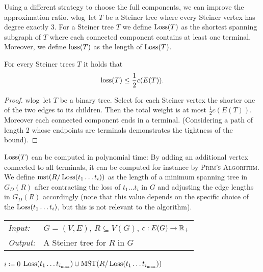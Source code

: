 \documentclass[../skript.tex]{subfiles}
\begin{document}
Using a different strategy to choose the full components, we can improve the approximation ratio. \ac{wlog}\ let $T$ be a Steiner tree where every Steiner vertex has degree exactly 3.
For a Steiner tree $T$ we define $\operatorname{Loss}(T)$ as the shortest spanning subgraph of $T$ where each connected component contains at least one terminal. Moreover, we define $\operatorname{loss}(T)$ as the length of $\operatorname{Loss}(T)$.
\begin{lemma} %
\label{thm:78}
For every Steiner trees $T$ it holds that
\[
	\operatorname{loss}(T) \leq \frac{1}{2} c(E(T)).
\]
\end{lemma}
\begin{proof}
\ac{wlog}\ let $T$ be a binary tree. Select for each Steiner vertex the shorter one of the two edges to its children. Then the total weight is at most $\frac{1}{2} c(E(T))$. Moreover each connected component ends in a terminal. (Considering a path of length 2 whose endpoints are terminals demonstrates the tightness of the bound).
\end{proof}
$\operatorname{Loss}(T)$ can be computed in polynomial time: By adding an additional vertex connected to all terminals, it can be computed for instance by \textsc{Prim's Algorithm}.
We define $\operatorname{mst}(R/\operatorname{Loss}(t_1 \ldots t_i))$ as the length of a minimum spanning tree in $G_D(R)$ after contracting the loss of $t_1 \ldots t_i$ in $G$ and adjusting the edge lengths in $G_D(R)$ accordingly (note that this value depends on the specific choice of the $\operatorname{Loss}(t_1 \ldots t_i)$, but this is not relevant to the algorithm).
\begin{samepage}
\begin{algorithmbox}
\begin{tabular}{@{}ll}
\textit{Input:} & $G = (V, E)$, $R \subseteq V(G)$, $c : E(G) \to \mathbb{R}_+$\\
\textit{Output:} & A Steiner tree for $R$ in $G$
\end{tabular}
\end{algorithmbox}
\vspace{-7pt}
\begin{algorithm}[H]
$i \coloneqq 0$\;
\Return $\operatorname{Loss}(t_1 \ldots t_{i_{\max}}) \cup \operatorname{MST}(R/\operatorname{Loss}(t_1 \ldots t_{i_{\max}}))$\;
\end{algorithm}
\vspace{-7pt}
\EndAlgorithmLine
\end{samepage}
\end{document}
